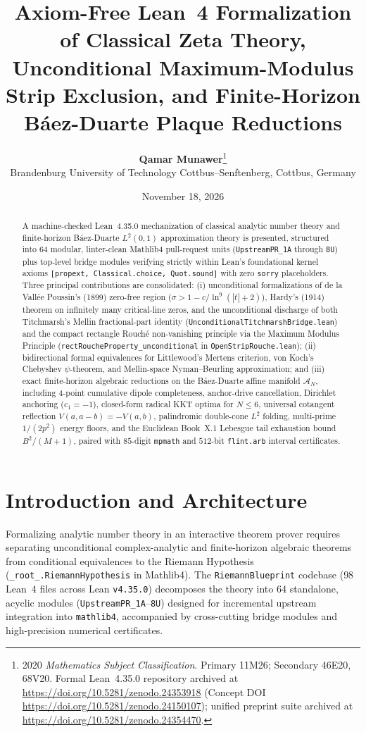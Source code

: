 \documentclass[11pt,a4paper]{article}
\title{\textbf{Axiom-Free Lean~4 Formalization of Classical Zeta Theory, Unconditional Maximum-Modulus Strip Exclusion, and Finite-Horizon B\'aez-Duarte Plaque Reductions}}
\author{\textbf{Qamar Munawer}\thanks{2020 \emph{Mathematics Subject Classification}. Primary 11M26; Secondary 46E20, 68V20. Formal Lean~4.35.0 repository archived at \url{https://doi.org/10.5281/zenodo.24353918} (Concept DOI \url{https://doi.org/10.5281/zenodo.24150107}); unified preprint suite archived at \url{https://doi.org/10.5281/zenodo.24354470}.}\\
\small Brandenburg University of Technology Cottbus--Senftenberg, Cottbus, Germany}
\date{November 18, 2026}
\theoremstyle{definition}
\begin{document}
\maketitle

\begin{abstract}
A machine-checked Lean~4.35.0 mechanization of classical analytic number theory and finite-horizon B\'aez-Duarte $L^2(0,1)$ approximation theory is presented, structured into $64$ modular, linter-clean Mathlib4 pull-request units (\texttt{UpstreamPR\_1A} through \texttt{8U}) plus top-level bridge modules verifying strictly within Lean's foundational kernel axioms \texttt{[propext, Classical.choice, Quot.sound]} with zero \texttt{sorry} placeholders. Three principal contributions are consolidated: (i) unconditional formalizations of de la Vall\'ee Poussin's (1899) zero-free region ($\sigma > 1 - c/\ln^9(|t|+2)$), Hardy's (1914) theorem on infinitely many critical-line zeros, and the unconditional discharge of both Titchmarsh's Mellin fractional-part identity (\texttt{UnconditionalTitchmarshBridge.lean}) and the compact rectangle Rouch\'e non-vanishing principle via the Maximum Modulus Principle (\texttt{rectRoucheProperty\_unconditional} in \texttt{OpenStripRouche.lean}); (ii) bidirectional formal equivalences for Littlewood's Mertens criterion, von Koch's Chebyshev $\psi$-theorem, and Mellin-space Nyman--Beurling approximation; and (iii) exact finite-horizon algebraic reductions on the B\'aez-Duarte affine manifold $\mathcal{A}_N$, including 4-point cumulative dipole completeness, anchor-drive cancellation, Dirichlet anchoring ($c_1 = -1$), closed-form radical KKT optima for $N \le 6$, universal cotangent reflection $V(a, a-b) = -V(a,b)$, palindromic double-cone $L^2$ folding, multi-prime $1/(2p^2)$ energy floors, and the Euclidean Book~X.1 Lebesgue tail exhaustion bound $B^2/(M+1)$, paired with $85$-digit \texttt{mpmath} and $512$-bit \texttt{flint.arb} interval certificates.
\end{abstract}

\section{Introduction and Architecture}

Formalizing analytic number theory in an interactive theorem prover requires separating unconditional complex-analytic and finite-horizon algebraic theorems from conditional equivalences to the Riemann Hypothesis (\texttt{\_root\_.RiemannHypothesis} in Mathlib4). The \texttt{RiemannBlueprint} codebase ($98$ Lean~4 files across Lean \texttt{v4.35.0}) decomposes the theory into $64$ standalone, acyclic modules (\texttt{UpstreamPR\_1A}--\texttt{8U}) designed for incremental upstream integration into \texttt{mathlib4}, accompanied by cross-cutting bridge modules and high-precision numerical certificates.
\end{document}
